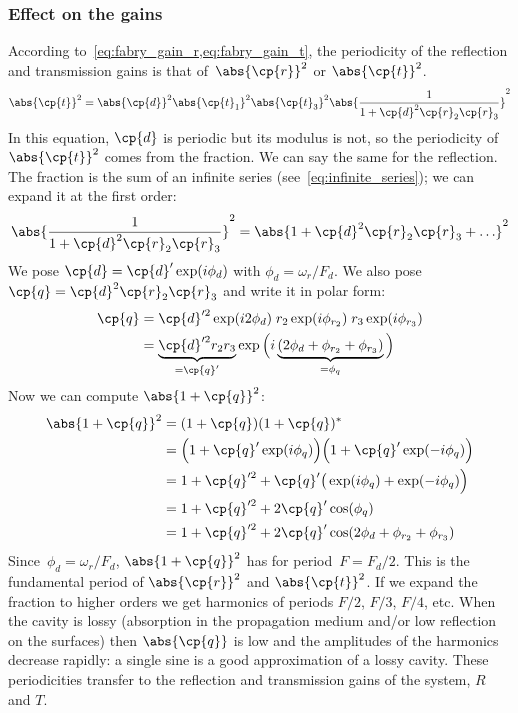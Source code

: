 \begin{refsection}

\subsubsection{Effect on the gains}
\label{sec:fabry_gain}

According to~\cref{eq:fabry_gain_r,eq:fabry_gain_t},
the periodicity of the reflection and transmission gains is that of~$\abs{\cp{r}}^2$ or $\abs{\cp{t}}^2$.
\begin{equation}
    \abs{\cp{t}}^2 = \abs{\cp{d}}^2 \abs{\cp{t}_1}^2 \abs{\cp{t}_3}^2
    \abs{
        \frac{1}{1 + \cp{d}^2 \cp{r}_2 \cp{r}_3}
    }^2
    \label{eq:fabry_gain_r2_r3}
\end{equation}
In this equation, $\cp{d}$ is periodic but its modulus is not,
so the periodicity of~$\abs{\cp{t}}^2$ comes from the fraction.
We can say the same for the reflection.
The fraction is the sum of an infinite series (see~\cref{eq:infinite_series}); we can expand it at the first order:
\begin{equation}
    \abs{
        \frac{1}{1 + \cp{d}^2 \cp{r}_2 \cp{r}_3}
    }^2
    =
    \abs{
        1 + \cp{d}^2 \cp{r}_2 \cp{r}_3 + \ldots
    }^2
\end{equation}
We pose
$\cp{d} = \cp{d}' \exp(i\phi_d)$ with $\phi_d = \omega_r/F_d$.
We also pose
$\cp{q} = \cp{d}^2 \cp{r}_2 \cp{r}_3$ and write it in polar form:
\begin{align}
    \cp{q}
    &=
    \cp{d}'^2 \exp(i2\phi_d)    \;
    r_2 \exp(i\phi_{r_2}) \;
    r_3 \exp(i\phi_{r_3})
    \\
    &=
    \underbrace{\cp{d}'^2 r_2 r_3}_{=\cp{q}'}
    \exp
    \Big(
        i
        \underbrace{(2 \phi_d + \phi_{r_2} + \phi_{r_3})}_{=\phi_q}
    \Big)
\end{align}
Now we can compute $\abs{1+\cp{q}}^2$:
\begin{align}
    \abs{1+\cp{q}}^2
    &=
    (1+\cp{q}) (1+\cp{q})^*
    \\
    &=
    \Big(1 + \cp{q}' \exp(i\phi_q)\Big)
    \Big(1 + \cp{q}' \exp(-i\phi_q)\Big)
    \\
    &=
    1 + \cp{q}'^2 + \cp{q}' \big( \exp(i\phi_q) + \exp(-i\phi_q) \Big)
    \\
    &=
    1 + \cp{q}'^2 + 2\cp{q}' \cos(\phi_q)
    \\
    &=
    1 + \cp{q}'^2 + 2\cp{q}' \cos(2 \phi_d + \phi_{r_2} + \phi_{r_3})
\end{align}
Since~$\phi_d = \omega_r/F_d$, $\abs{1+\cp{q}}^2$ has for period~$F=F_d/2$.
This is the fundamental period of $\abs{\cp{r}}^2$ and $\abs{\cp{t}}^2$.
If we expand the fraction to higher orders
we get harmonics of periods $F/2$, $F/3$, $F/4$, etc.
When the cavity is lossy (absorption in the propagation medium and/or low reflection on the surfaces) then $\abs{\cp{q}}$ is low and the amplitudes of the harmonics decrease rapidly: a single sine is a good approximation of a lossy cavity.
These periodicities transfer to the reflection and transmission gains of the system, $R$ and $T$.


\end{refsection}
